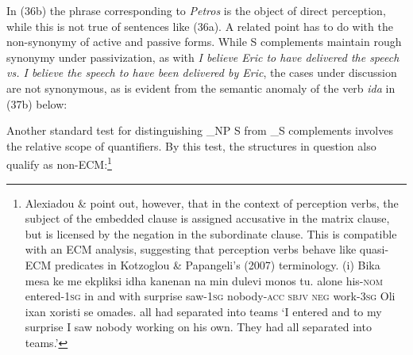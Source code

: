 \documentclass[output=paper]{langsci/langscibook}
\begin{document}
In (36b) the phrase corresponding to \textit{Petros} is the object of direct perception, while this is not true of sentences like (36a). A related point has to do with the non-synonymy of active and passive forms. While S complements maintain rough synonymy under passivization, as with \textit{I believe Eric to have delivered the speech vs. I believe the speech to have been delivered by Eric}, the cases under discussion are not synonymous, as is evident from the semantic anomaly of the verb \textit{ida} in (37b) below:

\ea%
    \label{ex:alexiadou:37}
    \z
\z
    
Another standard test for distinguishing \_NP S from \_S complements involves the relative scope of quantifiers. By this test, the structures in question also qualify as non-ECM:\footnote{Alexiadou \& \citet{Anagnostopoulou2016} point out, however, that in the context of perception verbs, the subject of the embedded clause is assigned accusative in the matrix clause, but is licensed by the negation in the subordinate clause. This is compatible with an ECM analysis, suggesting that perception verbs behave like quasi-ECM predicates in Kotzoglou \& Papangeli’s (2007) terminology. (i)  Bika         mesa    ke me     ekpliksi idha       kanenan         na min dulevi monos tu.  alone his-\textsc{nom}  entered{}-\textsc{1sg} in   and with   surprise saw{}-\textsc{1sg} nobody{}-\textsc{acc  sbjv  neg} work{}-\textsc{3sg}   Oli ixan xoristi      se omades.  all had separated into teams  ‘I entered and to my surprise I saw nobody working on his own. They had all separated into teams.’}
\end{document}
